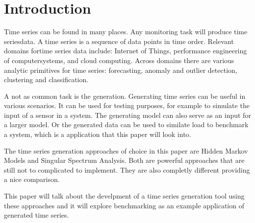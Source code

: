 
\chapter{Introduction}\label{chapter:introduction}

Time series can be found in many places. Any monitoring task will produce time seriesdata.  A time series is a sequence of data points in time order.  Relevant domains fortime series data include:  Internet of Things,  performance engineering of computersystems, and cloud computing. Across domains there are various analytic primitives for time series: forecasting, anomaly and outlier detection, clustering and classification.

A not as common task is the generation. Generating time series can be useful in various scenarios. It can be used for testing purposes, for example to simulate the input of a sensor in a system. The generating model can also serve as an input for a larger model. Or the generated data can be used to similate load to benchmark a system, which is a application that this paper will look into. 

The time series generation approaches of choice in this paper are Hidden Markov Models and Singular Spectrum Analysis. Both are powerful approaches that are still not to complicated to implement. They are also completly different providing a nice comparison. 

This paper will talk about the develpment of a time series generation tool using these approaches and it will explore benchmarking as an example application of generated time series. 